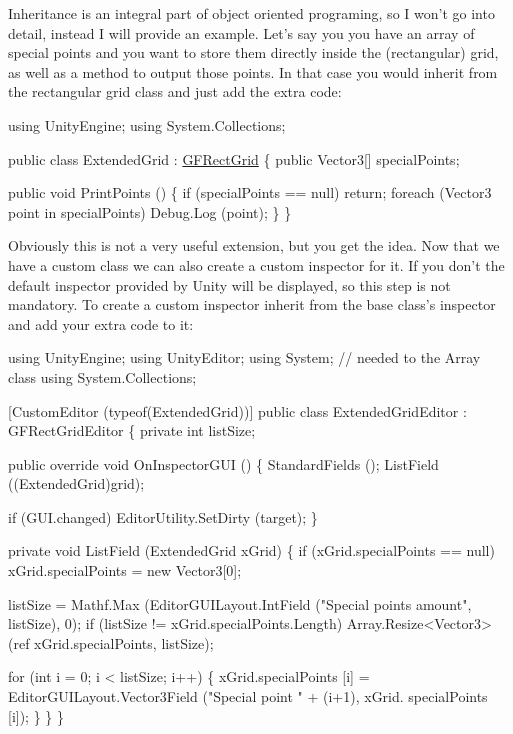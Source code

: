 Inheritance is an integral part of object oriented programing, so I won't go into detail, instead I will provide an example. Let's say you you have an array of special points and you want to store them directly inside the (rectangular) grid, as well as a method to output those points. In that case you would inherit from the rectangular grid class and just add the extra code\+: 
\begin{DoxyCode}
\textcolor{keyword}{using} UnityEngine;
\textcolor{keyword}{using} System.Collections;

\textcolor{keyword}{public} \textcolor{keyword}{class }ExtendedGrid : \hyperlink{class_g_f_rect_grid}{GFRectGrid} \{
    \textcolor{keyword}{public} Vector3[] specialPoints;

    \textcolor{keyword}{public} \textcolor{keywordtype}{void} PrintPoints () \{
        \textcolor{keywordflow}{if} (specialPoints == null)
            \textcolor{keywordflow}{return};
        \textcolor{keywordflow}{foreach} (Vector3 point \textcolor{keywordflow}{in} specialPoints)
            Debug.Log (point);
    \}
\}
\end{DoxyCode}
 Obviously this is not a very useful extension, but you get the idea. Now that we have a custom class we can also create a custom inspector for it. If you don't the default inspector provided by Unity will be displayed, so this step is not mandatory. To create a custom inspector inherit from the base class's inspector and add your extra code to it\+: 
\begin{DoxyCode}
\textcolor{keyword}{using} UnityEngine;
\textcolor{keyword}{using} UnityEditor;
\textcolor{keyword}{using} System; \textcolor{comment}{// needed to the Array class}
\textcolor{keyword}{using} System.Collections;

[CustomEditor (typeof(ExtendedGrid))]
\textcolor{keyword}{public} \textcolor{keyword}{class }ExtendedGridEditor : GFRectGridEditor \{
    \textcolor{keyword}{private} \textcolor{keywordtype}{int} listSize;

    \textcolor{keyword}{public} \textcolor{keyword}{override} \textcolor{keywordtype}{void} OnInspectorGUI () \{
        StandardFields ();
        ListField ((ExtendedGrid)grid);

        \textcolor{keywordflow}{if} (GUI.changed)
            EditorUtility.SetDirty (target);
    \}

    \textcolor{keyword}{private} \textcolor{keywordtype}{void} ListField (ExtendedGrid xGrid) \{
        \textcolor{keywordflow}{if} (xGrid.specialPoints == null)
            xGrid.specialPoints = \textcolor{keyword}{new} Vector3[0];

        listSize = Mathf.Max (EditorGUILayout.IntField (\textcolor{stringliteral}{"Special points amount"}, listSize), 0);
        \textcolor{keywordflow}{if} (listSize != xGrid.specialPoints.Length) 
            Array.Resize<Vector3> (ref xGrid.specialPoints, listSize);

        \textcolor{keywordflow}{for} (\textcolor{keywordtype}{int} i = 0; i < listSize; i++) \{
            xGrid.specialPoints [i] = EditorGUILayout.Vector3Field (\textcolor{stringliteral}{"Special point "} + (i+1), xGrid.
      specialPoints [i]);
        \}
    \}
\}
\end{DoxyCode}
